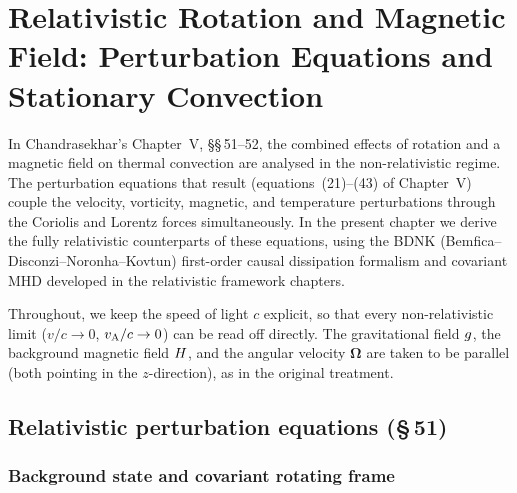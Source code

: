 %

\chapter{Relativistic Rotation and Magnetic Field: Perturbation Equations
  and Stationary Convection}
\label{ch:rel-rotmag-pert}

In Chandrasekhar's Chapter~V, \S\S\,51--52, the combined effects of
rotation and a magnetic field on thermal convection are analysed in the
non-relativistic regime.  The perturbation equations that result
(equations~(21)--(43) of Chapter~V) couple the velocity, vorticity,
magnetic, and temperature perturbations through the Coriolis and
Lorentz forces simultaneously.  In the present chapter we derive the
fully relativistic counterparts of these equations, using the
BDNK (Bemfica--Disconzi--Noronha--Kovtun) first-order causal
dissipation formalism and covariant MHD developed in the relativistic
framework chapters.

Throughout, we keep the speed of light $c$ explicit, so that every
non-relativistic limit ($v/c\to 0$, $v_{\mathrm{A}}/c\to 0$) can be read off
directly.  The gravitational field $g$, the background
magnetic field $H$, and the angular velocity
$\boldsymbol{\Omega}$ are taken to be parallel (both pointing in the
$z$-direction), as in the original treatment.

\section{Relativistic perturbation equations (\S\,51)}
\label{sec:rel-51}

\subsection{Background state and covariant rotating frame}
\label{sec:background-rot-mag}

